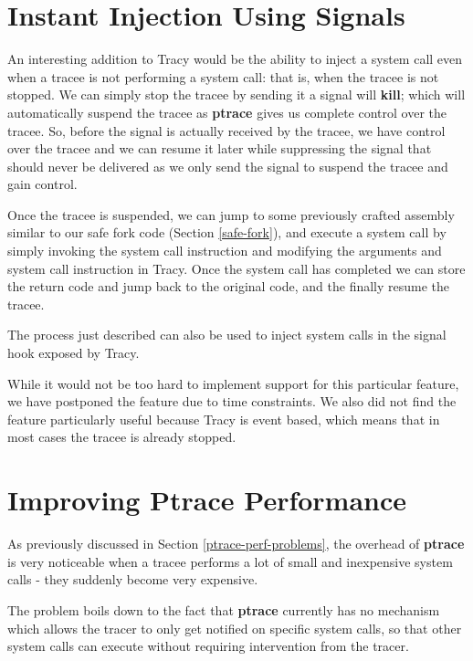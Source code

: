 \documentclass[a4paper, 10pt]{report}
\begin{document}
\section{Instant Injection Using Signals}
\label{instant-inject}

An interesting addition to Tracy would be the ability to inject a system call
even when a tracee is not performing a system call: that is, when the tracee
is not stopped. We can simply stop the tracee by sending it a signal will
\textbf{kill}; which will automatically suspend the tracee as
\textbf{ptrace} gives us complete control over the tracee.
So, before the signal is actually received by the tracee, we have control
over the tracee and we can resume it later while suppressing the signal that
should never be delivered as we only send the signal to suspend the tracee and
gain control.

Once the tracee is suspended, we can jump to some previously crafted assembly
similar to our safe fork code (Section \ref{safe-fork}), and execute a system
call by simply invoking the system call instruction and modifying the
arguments and system call instruction in Tracy. Once the system call
has completed we can store the return code and jump back to the original code,
and the finally resume the tracee.

The process just described can also be used to inject system calls
in the signal hook exposed by Tracy.

While it would not be too hard to implement support for this particular
feature, we have postponed the feature due to time constraints. We also
did not find the feature particularly useful because Tracy is event based,
which means that in most cases the tracee is already stopped.

\section{Improving Ptrace Performance}
\label{ptrace-perf}

As previously discussed in Section \ref{ptrace-perf-problems}, the overhead
of \textbf{ptrace} is very noticeable when a tracee performs a lot of
small and inexpensive system calls - they suddenly become very expensive.

The problem boils down to the fact that \textbf{ptrace} currently
has no mechanism which allows the tracer to only get notified on specific
system calls, so that other system calls can execute without requiring
intervention from the tracer.
\end{document}
